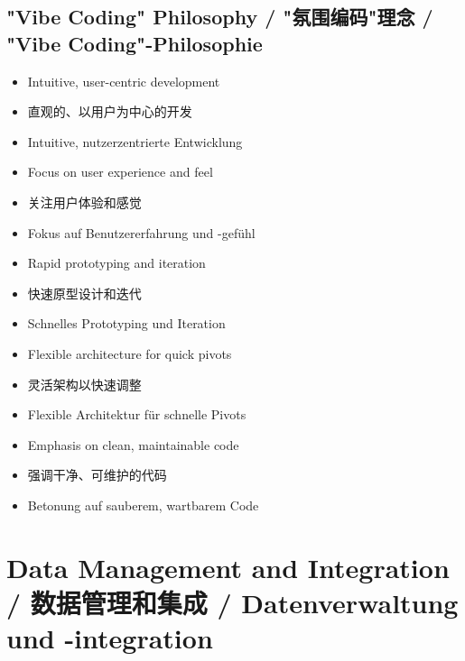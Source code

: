 \subsection{"Vibe Coding" Philosophy / "氛围编码"理念 / "Vibe Coding"-Philosophie}
\begin{itemize}
    \item Intuitive, user-centric development
    \item 直观的、以用户为中心的开发
    \item Intuitive, nutzerzentrierte Entwicklung
    \item Focus on user experience and feel
    \item 关注用户体验和感觉
    \item Fokus auf Benutzererfahrung und -gefühl
    \item Rapid prototyping and iteration
    \item 快速原型设计和迭代
    \item Schnelles Prototyping und Iteration
    \item Flexible architecture for quick pivots
    \item 灵活架构以快速调整
    \item Flexible Architektur für schnelle Pivots
    \item Emphasis on clean, maintainable code
    \item 强调干净、可维护的代码
    \item Betonung auf sauberem, wartbarem Code
\end{itemize}

\section{Data Management and Integration / 数据管理和集成 / Datenverwaltung und -integration}

